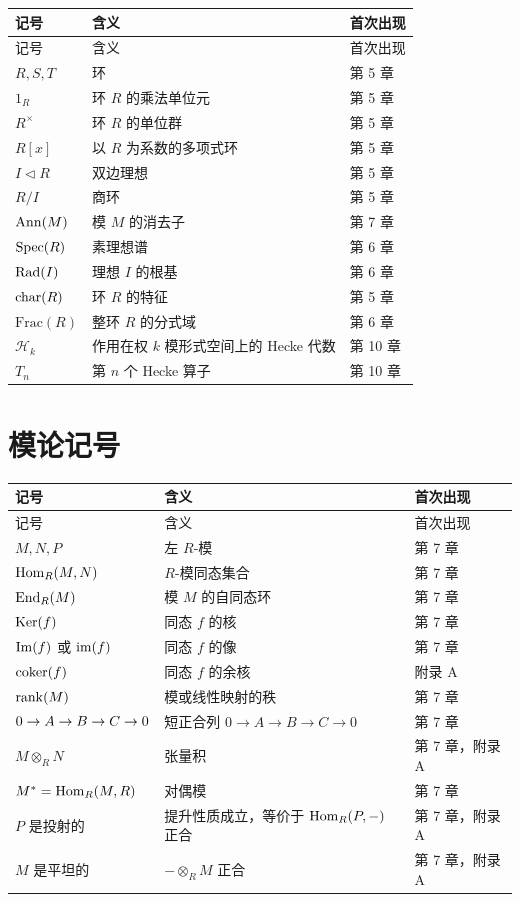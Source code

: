\begin{longtable}{p{}p{}p{}}
\toprule
记号 & 含义 & 首次出现 \\
\midrule
\endfirsthead
\toprule
记号 & 含义 & 首次出现 \\
\midrule
\endhead
$R,S,T$ & 环 & 第 5 章 \\
$1_R$ & 环 $R$ 的乘法单位元 & 第 5 章 \\
$R^{\times}$ & 环 $R$ 的单位群 & 第 5 章 \\
$R[x]$ & 以 $R$ 为系数的多项式环 & 第 5 章 \\
$I\lhd R$ & 双边理想 & 第 5 章 \\
$R/I$ & 商环 & 第 5 章 \\
$\mathrm{Ann}(M)$ & 模 $M$ 的消去子 & 第 7 章 \\
$\mathrm{Spec}(R)$ & 素理想谱 & 第 6 章 \\
$\operatorname{Rad}(I)$ & 理想 $I$ 的根基 & 第 6 章 \\
$\mathrm{char}(R)$ & 环 $R$ 的特征 & 第 5 章 \\
$\mathrm{Frac}(R)$ & 整环 $R$ 的分式域 & 第 6 章 \\
$\mathcal{H}_k$ & 作用在权 $k$ 模形式空间上的 Hecke 代数 & 第 10 章 \\
$T_n$ & 第 $n$ 个 Hecke 算子 & 第 10 章 \\
\bottomrule
\end{longtable}

\section{模论记号}

\begin{longtable}{p{}p{}p{}}
\toprule
记号 & 含义 & 首次出现 \\
\midrule
\endfirsthead
\toprule
记号 & 含义 & 首次出现 \\
\midrule
\endhead
$M,N,P$ & 左 $R$-模 & 第 7 章 \\
$\mathrm{Hom}_R(M,N)$ & $R$-模同态集合 & 第 7 章 \\
$\mathrm{End}_R(M)$ & 模 $M$ 的自同态环 & 第 7 章 \\
$\mathrm{Ker}(f)$ & 同态 $f$ 的核 & 第 7 章 \\
$\mathrm{Im}(f)$ 或 $\operatorname{im}(f)$ & 同态 $f$ 的像 & 第 7 章 \\
$\operatorname{coker}(f)$ & 同态 $f$ 的余核 & 附录 A \\
$\operatorname{rank}(M)$ & 模或线性映射的秩 & 第 7 章 \\
$0 \to A \to B \to C \to 0$ & 短正合列 $0\to A\to B\to C\to 0$ & 第 7 章 \\
$M\otimes_R N$ & 张量积 & 第 7 章，附录 A \\
$M^*=\mathrm{Hom}_R(M,R)$ & 对偶模 & 第 7 章 \\
$P$ 是投射的 & 提升性质成立，等价于 $\mathrm{Hom}_R(P,-)$ 正合 & 第 7 章，附录 A \\
$M$ 是平坦的 & $-\otimes_R M$ 正合 & 第 7 章，附录 A \\
\bottomrule
\end{longtable}

